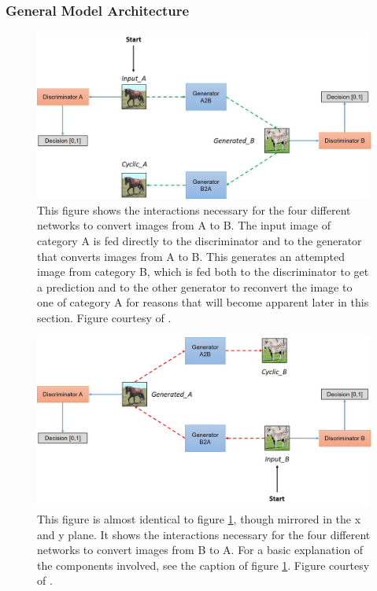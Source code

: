 \documentclass[12pt, fleqn, titlepage]{article}
\begin{document}
\subsubsection{General Model Architecture}
\begin{figure}[H]
	\centering
	\includegraphics[width=0.7\linewidth]{imgs/cyclegan_architecture}
	\caption{This figure shows the interactions necessary for the four different networks to convert images from A to B. The input image of category A is fed directly to the discriminator and to the generator that converts images from A to B. This generates an attempted image from category B, which is fed both to the discriminator to get a prediction and to the other generator to reconvert the image to one of category A for reasons that will become apparent later in this section. Figure courtesy of \cite{model_architecture}.}
	\label{fig:cycleganarchitecture}
\end{figure}

\begin{figure}[H]
	\centering
	\includegraphics[width=0.7\linewidth]{imgs/cyclegan_architecture2}
	\caption{This figure is almost identical to figure \ref{fig:cycleganarchitecture}, though mirrored in the x and y plane. It shows the interactions necessary for the four different networks to convert images from B to A. For a basic explanation of the components involved, see the caption of figure \ref{fig:cycleganarchitecture}. Figure courtesy of \cite{model_architecture}.}
	\label{fig:cycleganarchitecture2}
\end{figure}
\end{document}
